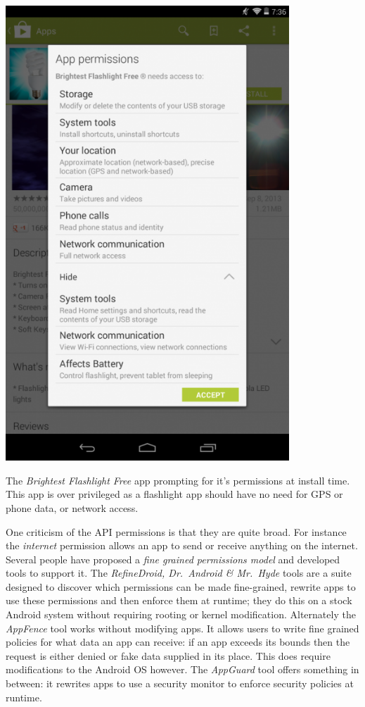 \documentclass[report.tex]{subfiles}
\begin{document}
\begin{marginfigure}\label{img:brightestflashlight}
  \centering
  \includegraphics[width=0.8\textwidth]{img/brightestflashlight.png}
  \caption{The \emph{Brightest Flashlight Free} app prompting for it's permissions
    at install time.  This app is over privileged as a flashlight app should have
    no need for GPS or phone data, or network access.}
\end{marginfigure}

One criticism of the API permissions is that they are quite broad.  For instance
the \emph{internet} permission allows an app to send or receive anything on the
internet.  Several people have proposed a \emph{fine grained permissions model}
and developed tools to support it.  The \emph{RefineDroid, Dr.~Android \&
  Mr.~Hyde} tools\cite{Jeon:2012ki} are a suite designed to discover which
permissions can be made fine-grained, rewrite apps to use these permissions and
then enforce them at runtime; they do this on a stock Android system without
requiring rooting or kernel modification. Alternately the \emph{AppFence}
tool\cite{Hornyack:2011wq} works without modifying apps.  It allows users to
write fine grained policies for what data an app can receive: if an app exceeds
its bounds then the request is either denied or fake data supplied in its place.
This does require modifications to the Android OS however.  The \emph{AppGuard}
tool\cite{Backes:2013ec} offers something in between: it rewrites apps to use a
security monitor to enforce security policies at runtime.
\end{document}
